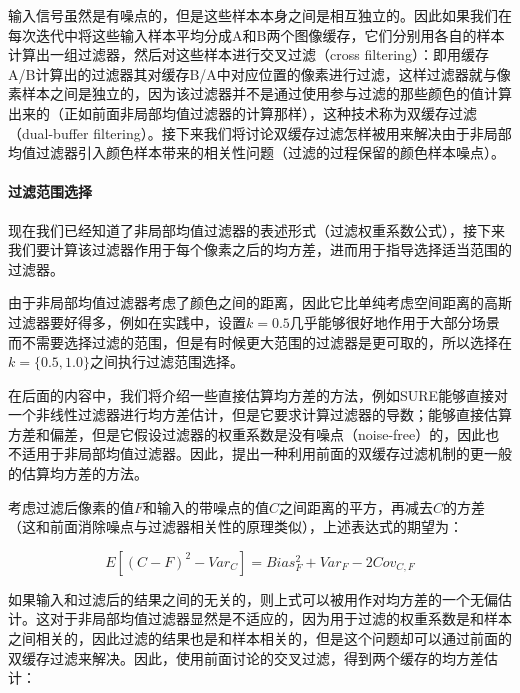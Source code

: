 输入信号虽然是有噪点的，但是这些样本本身之间是相互独立的。因此如果我们在每次迭代中将这些输入样本平均分成A和B两个图像缓存，它们分别用各自的样本计算出一组过滤器，然后对这些样本进行交叉过滤（cross filtering）：即用缓存A/B计算出的过滤器其对缓存B/A中对应位置的像素进行过滤，这样过滤器就与像素样本之间是独立的，因为该过滤器并不是通过使用参与过滤的那些颜色的值计算出来的（正如前面非局部均值过滤器的计算那样），这种技术称为双缓存过滤（dual-buffer filtering）。接下来我们将讨论双缓存过滤怎样被用来解决由于非局部均值过滤器引入颜色样本带来的相关性问题（过滤的过程保留的颜色样本噪点）。





\paragraph{过滤范围选择}
现在我们已经知道了非局部均值过滤器的表述形式（过滤权重系数公式），接下来我们要计算该过滤器作用于每个像素之后的均方差，进而用于指导选择适当范围的过滤器。

由于非局部均值过滤器考虑了颜色之间的距离，因此它比单纯考虑空间距离的高斯过滤器要好得多，例如在实践中，设置$k=0.5$几乎能够很好地作用于大部分场景而不需要选择过滤的范围，但是有时候更大范围的过滤器是更可取的，所以\cite{a:NonlinearlyWeightedFirstorderRegressionforDenoisingMonteCarloRenderings}选择在$k=\{0.5,1.0\}$之间执行过滤范围选择。

在后面的内容中，我们将介绍一些直接估算均方差的方法，例如SURE\cite{a:SUREbasedOptimizationforAdaptiveSamplingandReconstruction}能够直接对一个非线性过滤器进行均方差估计，但是它要求计算过滤器的导数；\cite{a:AdaptiveRenderingbasedonWeightedLocalRegression}能够直接估算方差和偏差，但是它假设过滤器的权重系数是没有噪点（noise-free）的，因此也不适用于非局部均值过滤器。因此，\cite{a:NonlinearlyWeightedFirstorderRegressionforDenoisingMonteCarloRenderings}提出一种利用前面的双缓存过滤机制的更一般的估算均方差的方法。

考虑过滤后像素的值$F$和输入的带噪点的值$C$之间距离的平方，再减去$C$的方差（这和前面消除噪点与过滤器相关性的原理类似），上述表达式的期望为：

\begin{equation}
	E[(C-F)^{2}-Var_C]=Bias^{2}_F+Var_F-2Cov_{C,F}
\end{equation}

如果输入和过滤后的结果之间的无关的，则上式可以被用作对均方差的一个无偏估计。这对于非局部均值过滤器显然是不适应的，因为用于过滤的权重系数是和样本之间相关的，因此过滤的结果也是和样本相关的，但是这个问题却可以通过前面的双缓存过滤来解决。因此，使用前面讨论的交叉过滤，得到两个缓存的均方差估计：

